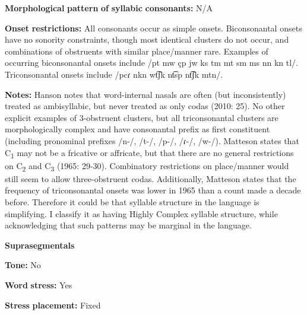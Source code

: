 \begin{styleBody}
\textbf{Morphological} \textbf{pattern} \textbf{of} \textbf{syllabic} \textbf{consonants:} N/A
\end{styleBody}

\begin{styleBody}
\textbf{Onset} \textbf{restrictions:} All consonants occur as simple onsets. Biconsonantal onsets have no sonority constraints, though most identical clusters do not occur, and combinations of obstruents with similar place/manner rare. Examples of occurring biconsonantal onsets include /pt mw çp jw ks tm mt sm ms nn kn tl/. Triconsonantal onsets include /pcɾ nkn wt͡ʃk nt͡sp nt͡ʃk mtn/.
\end{styleBody}

\begin{styleBody}
\textbf{Notes:} Hanson notes that word-internal nasals are often (but inconsistently) treated as ambisyllabic, but never treated as only codas (2010: 25). No other explicit examples of 3-obstruent clusters, but all triconsonantal clusters are morphologically complex and have consonantal prefix as first constituent (including pronominal prefixes /n-/, /t-/, /p-/, /ɾ{}-/, /w-/). Matteson states that C\textsubscript{1} may not be a fricative or affricate, but that there are no general restrictions on C\textsubscript{2} and C\textsubscript{3} (1965: 29-30). Combinatory restrictions on place/manner would still seem to allow three-obstruent codas. Additionally, Matteson states that the frequency of triconsonantal onsets was lower in 1965 than a count made a decade before. Therefore it could be that syllable structure in the language is simplifying. I classify it as having Highly Complex syllable structure, while acknowledging that such patterns may be marginal in the language.
\end{styleBody}

\begin{styleBody}
\textbf{Suprasegmentals}
\end{styleBody}

\begin{styleBody}
\textbf{Tone:} No
\end{styleBody}

\begin{styleBody}
\textbf{Word} \textbf{stress:} Yes
\end{styleBody}

\begin{styleBody}
\textbf{Stress} \textbf{placement:} Fixed
\end{styleBody}

